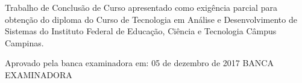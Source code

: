 \begin{folhadeaprovacao}
\linespread{1.5}

  \begin{center}
    {\chapterfont \insereautor}
    \vfill\vspace{2cm}
    {\chapterfont\bfseries \inseretitulo}
    \vfill\vspace{1.5cm}
    \end{center}
    
    \hspace{.45\textwidth}
    \begin{minipage}{.47\linewidth}
	\vfill	
	Trabalho de Conclus\~{a}o de Curso apresentado como exig\^encia parcial para obten\c{c}\~{a}o do diploma do Curso de Tecnologia em An\'{a}lise e Desenvolvimento de Sistemas do Instituto Federal de Educa\c{c}\~{a}o, Ci\^{e}ncia e Tecnologia C\^{a}mpus Campinas.
    \end{minipage}
\vfill\vspace{1cm}  

\begin{center}
Aprovado pela banca examinadora em: 05 de dezembro de 2017
\vfill \vspace{1cm}
{\large BANCA EXAMINADORA}
\end{center}
\end{folhadeaprovacao}
